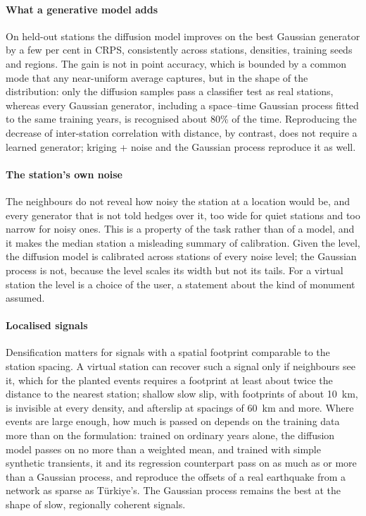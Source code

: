 \documentclass[preprint,12pt,authoryear]{elsarticle}
\begin{document}
\paragraph{What a generative model adds} On held-out stations the diffusion model
improves on the best Gaussian generator by a few per cent in CRPS, consistently across
stations, densities, training seeds and regions. The gain is not in point accuracy, which
is bounded by a common mode that any near-uniform average captures, but in the shape of
the distribution: only the diffusion samples pass a classifier test as real stations,
whereas every Gaussian generator, including a space--time Gaussian process fitted to the
same training years, is recognised about 80\% of the time. Reproducing the decrease of
inter-station correlation with distance, by contrast, does not require a learned
generator; kriging + noise and the Gaussian process reproduce it as well.

\paragraph{The station's own noise} The neighbours do not reveal how noisy the station at
a location would be, and every generator that is not told hedges over it, too wide for
quiet stations and too narrow for noisy ones. This is a property of the task rather than
of a model, and it makes the median station a misleading summary of calibration. Given
the level, the diffusion model is calibrated across stations of every noise level; the
Gaussian process is not, because the level scales its width but not its tails. For a
virtual station the level is a choice of the user, a statement about the kind of monument assumed.

\paragraph{Localised signals} Densification matters for signals with a spatial footprint
comparable to the station spacing. A virtual station can recover such a signal only if
neighbours see it, which for the planted events requires a footprint at least about twice
the distance to the nearest station; shallow slow slip, with footprints of about 10~km,
is invisible at every density, and afterslip at spacings of 60~km and more. Where events
are large enough, how much is passed on depends on the training data more than on the
formulation: trained on ordinary years alone, the diffusion model passes on no more than
a weighted mean, and trained with simple synthetic transients, it and its regression
counterpart pass on as much as or more than a Gaussian process, and reproduce the offsets
of a real earthquake from a network as sparse as T\"urkiye's. The Gaussian process
remains the best at the shape of slow, regionally coherent signals.
\end{document}
